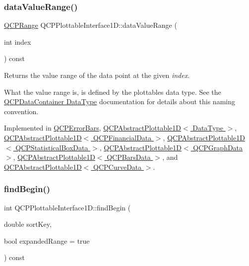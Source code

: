 \subsubsection{\texorpdfstring{data\+Value\+Range()}{dataValueRange()}}
{\footnotesize\ttfamily \hyperlink{classQCPRange}{Q\+C\+P\+Range} Q\+C\+P\+Plottable\+Interface1\+D\+::data\+Value\+Range (\begin{DoxyParamCaption}\item[{int}]{index }\end{DoxyParamCaption}) const\hspace{0.3cm}{\ttfamily [pure virtual]}}

Returns the value range of the data point at the given {\itshape index}.

What the value range is, is defined by the plottable\textquotesingle{}s data type. See the \hyperlink{classQCPDataContainer_qcpdatacontainer-datatype}{Q\+C\+P\+Data\+Container Data\+Type} documentation for details about this naming convention. 

Implemented in \hyperlink{classQCPErrorBars_af71af55d929d832daf32e283b21e1f3e}{Q\+C\+P\+Error\+Bars}, \hyperlink{classQCPAbstractPlottable1D_a55f937ba6a63e56e57f0b1a6e85a333a}{Q\+C\+P\+Abstract\+Plottable1\+D$<$ Data\+Type $>$}, \hyperlink{classQCPAbstractPlottable1D_a55f937ba6a63e56e57f0b1a6e85a333a}{Q\+C\+P\+Abstract\+Plottable1\+D$<$ Q\+C\+P\+Financial\+Data $>$}, \hyperlink{classQCPAbstractPlottable1D_a55f937ba6a63e56e57f0b1a6e85a333a}{Q\+C\+P\+Abstract\+Plottable1\+D$<$ Q\+C\+P\+Statistical\+Box\+Data $>$}, \hyperlink{classQCPAbstractPlottable1D_a55f937ba6a63e56e57f0b1a6e85a333a}{Q\+C\+P\+Abstract\+Plottable1\+D$<$ Q\+C\+P\+Graph\+Data $>$}, \hyperlink{classQCPAbstractPlottable1D_a55f937ba6a63e56e57f0b1a6e85a333a}{Q\+C\+P\+Abstract\+Plottable1\+D$<$ Q\+C\+P\+Bars\+Data $>$}, and \hyperlink{classQCPAbstractPlottable1D_a55f937ba6a63e56e57f0b1a6e85a333a}{Q\+C\+P\+Abstract\+Plottable1\+D$<$ Q\+C\+P\+Curve\+Data $>$}.

\mbox{\label{classQCPPlottableInterface1D_a5b95783271306a4de97be54eac1e7d13}} 
\subsubsection{\texorpdfstring{find\+Begin()}{findBegin()}}
{\footnotesize\ttfamily int Q\+C\+P\+Plottable\+Interface1\+D\+::find\+Begin (\begin{DoxyParamCaption}\item[{double}]{sort\+Key,  }\item[{bool}]{expanded\+Range = {\ttfamily true} }\end{DoxyParamCaption}) const\hspace{0.3cm}{\ttfamily [pure virtual]}}

